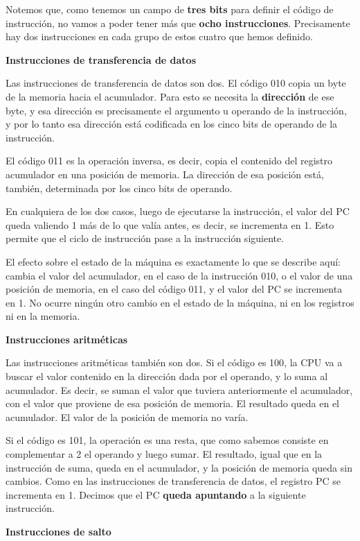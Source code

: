 \documentclass[spanish,a4paper,]{article}
\begin{document}
Notemos que, como tenemos un campo de \textbf{tres bits} para definir el
código de instrucción, no vamos a poder tener más que \textbf{ocho
instrucciones}. Precisamente hay dos instrucciones en cada grupo de
estos cuatro que hemos definido.

\textbf{Instrucciones de transferencia de datos}

Las instrucciones de transferencia de datos son dos. El código 010 copia
un byte de la memoria hacia el acumulador. Para esto se necesita la
\textbf{dirección} de ese byte, y esa dirección es precisamente el
argumento u operando de la instrucción, y por lo tanto esa dirección
está codificada en los cinco bits de operando de la instrucción.

El código 011 es la operación inversa, es decir, copia el contenido del
registro acumulador en una posición de memoria. La dirección de esa
posición está, también, determinada por los cinco bits de operando.

En cualquiera de los dos casos, luego de ejecutarse la instrucción, el
valor del PC queda valiendo 1 más de lo que valía antes, es decir, se
incrementa en 1. Esto permite que el ciclo de instrucción pase a la
instrucción siguiente.

El efecto sobre el estado de la máquina es exactamente lo que se
describe aquí: cambia el valor del acumulador, en el caso de la
instrucción 010, o el valor de una posición de memoria, en el caso del
código 011, y el valor del PC se incrementa en 1. No ocurre ningún otro
cambio en el estado de la máquina, ni en los registros ni en la memoria.

\textbf{Instrucciones aritméticas}

Las instrucciones aritméticas también son dos. Si el código es 100, la
CPU va a buscar el valor contenido en la dirección dada por el operando,
y lo suma al acumulador. Es decir, se suman el valor que tuviera
anteriormente el acumulador, con el valor que proviene de esa posición
de memoria. El resultado queda en el acumulador. El valor de la posición
de memoria no varía.

Si el código es 101, la operación es una resta, que como sabemos
consiste en complementar a 2 el operando y luego sumar. El resultado,
igual que en la instrucción de suma, queda en el acumulador, y la
posición de memoria queda sin cambios. Como en las instrucciones de
transferencia de datos, el registro PC se incrementa en 1. Decimos que
el PC \textbf{queda apuntando} a la siguiente instrucción.

\textbf{Instrucciones de salto}
\end{document}
